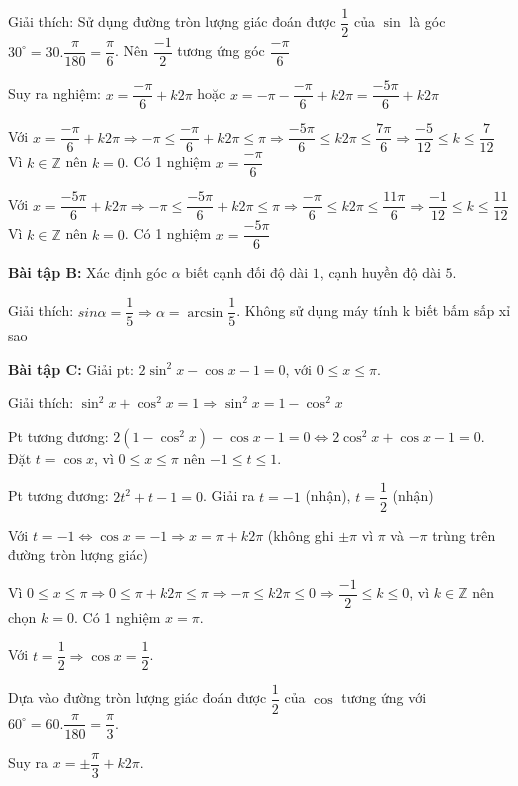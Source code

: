 \documentclass[12pt,a4paper]{article}
\begin{document}
Giải thích: Sử dụng đường tròn lượng giác đoán được $\dfrac{1}{2}$ của $\sin$ là góc $30^\circ = 30.\dfrac{\pi}{180} = \dfrac{\pi}{6}$. Nên $\dfrac{-1}{2}$ tương ứng góc $\dfrac{-\pi}{6}$

Suy ra nghiệm: $x = \dfrac{-\pi}{6} + k2\pi$ hoặc $x = -\pi - \dfrac{-\pi}{6} + k2\pi = \dfrac{-5\pi}{6} + k2\pi$

Với $x = \dfrac{-\pi}{6} + k2\pi \Rightarrow -\pi \le \dfrac{-\pi}{6} + k2\pi \le \pi \Rightarrow \dfrac{-5\pi}{6} \le k2\pi \le \dfrac{7\pi}{6} \Rightarrow \dfrac{-5}{12} \le k \le \dfrac{7}{12}$ Vì $k \in \mathbb{Z}$ nên $k = 0$. Có 1 nghiệm $x = \dfrac{-\pi}{6}$

Với $x = \dfrac{-5\pi}{6} + k2\pi \Rightarrow -\pi \le \dfrac{-5\pi}{6} + k2\pi \le \pi \Rightarrow \dfrac{-\pi}{6} \le k2\pi \le \dfrac{11\pi}{6} \Rightarrow \dfrac{-1}{12} \le k \le \dfrac{11}{12}$ Vì $k \in \mathbb{Z}$ nên $k = 0$. Có 1 nghiệm $x = \dfrac{-5\pi}{6}$

\textbf{Bài tập B:} Xác định góc $\alpha$ biết cạnh đối độ dài $1$, cạnh huyền độ dài $5$.

Giải thích: $sin \alpha = \dfrac{1}{5} \Rightarrow \alpha = \arcsin \dfrac{1}{5}$. Không sử dụng máy tính k biết bấm sấp xỉ sao

\textbf{Bài tập C:} Giải pt: $2\sin ^ 2 x - \cos x - 1 = 0$, với $0 \le x \le \pi$.

Giải thích: $\sin^2x + \cos^2x = 1 \Rightarrow \sin^2x = 1 - \cos^2x$

Pt tương đương: $2(1 - \cos^2x) - \cos x - 1 = 0 \Leftrightarrow 2\cos^2x + \cos x - 1 = 0$. Đặt $t = \cos x$, vì $0 \le x \le \pi$ nên $-1 \le t \le 1$.

Pt tương đương: $2t^2 + t - 1 = 0$. Giải ra $t = -1$ (nhận), $t = \dfrac{1}{2}$ (nhận)

Với $t = -1 \Leftrightarrow \cos x = -1 \Rightarrow x = \pi + k2\pi$ (không ghi $\pm \pi$ vì $\pi$ và $-\pi$ trùng trên đường tròn lượng giác)

Vì $0 \le x \le \pi \Rightarrow 0 \le \pi + k2\pi \le \pi \Rightarrow -\pi \le k2\pi \le 0 \Rightarrow \dfrac{-1}{2} \le k \le 0$, vì $k \in \mathbb{Z}$ nên chọn $k = 0$. Có 1 nghiệm $x = \pi$.

Với $t = \dfrac{1}{2} \Rightarrow \cos x = \dfrac{1}{2}$.

Dựa vào đường tròn lượng giác đoán được $\dfrac{1}{2}$ của $\cos$ tương ứng với $60^\circ = 60.\dfrac{\pi}{180} = \dfrac{\pi}{3}$.

Suy ra $x = \pm\dfrac{\pi}{3} + k2\pi$.
\end{document}

